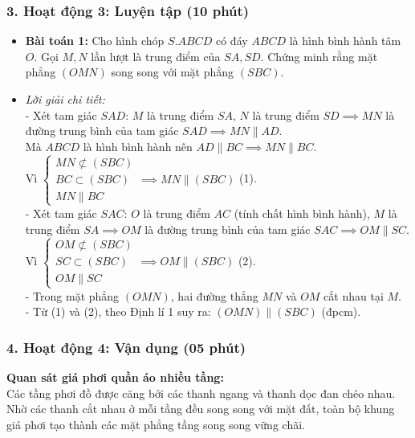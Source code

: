 \documentclass[12pt, a4paper]{article}
\begin{document}
\subsubsection*{3. Hoạt động 3: Luyện tập (10 phút)}
\begin{itemize}
    \item \textbf{Bài toán 1:} Cho hình chóp $S.ABCD$ có đáy $ABCD$ là hình bình hành tâm $O$. Gọi $M, N$ lần lượt là trung điểm của $SA, SD$. Chứng minh rằng mặt phẳng $(OMN)$ song song với mặt phẳng $(SBC)$.
    \item \textit{Lời giải chi tiết:}\\
    - Xét tam giác $SAD$: $M$ là trung điểm $SA$, $N$ là trung điểm $SD \implies MN$ là đường trung bình của tam giác $SAD \implies MN \parallel AD$.\\
    Mà $ABCD$ là hình bình hành nên $AD \parallel BC \implies MN \parallel BC$.\\
    Vì $\begin{cases} MN \not\subset (SBC) \\ BC \subset (SBC) \\ MN \parallel BC \end{cases} \implies MN \parallel (SBC)$ (1).\\
    - Xét tam giác $SAC$: $O$ là trung điểm $AC$ (tính chất hình bình hành), $M$ là trung điểm $SA \implies OM$ là đường trung bình của tam giác $SAC \implies OM \parallel SC$.\\
    Vì $\begin{cases} OM \not\subset (SBC) \\ SC \subset (SBC) \\ OM \parallel SC \end{cases} \implies OM \parallel (SBC)$ (2).\\
    - Trong mặt phẳng $(OMN)$, hai đường thẳng $MN$ và $OM$ cắt nhau tại $M$.\\
    - Từ (1) và (2), theo Định lí 1 suy ra: $(OMN) \parallel (SBC)$ (đpcm).
\end{itemize}

\subsubsection*{4. Hoạt động 4: Vận dụng (05 phút)}
\textbf{Quan sát giá phơi quần áo nhiều tầng:}\\
Các tầng phơi đồ được căng bởi các thanh ngang và thanh dọc đan chéo nhau. Nhờ các thanh cắt nhau ở mỗi tầng đều song song với mặt đất, toàn bộ khung giá phơi tạo thành các mặt phẳng tầng song song vững chãi.
\end{document}
